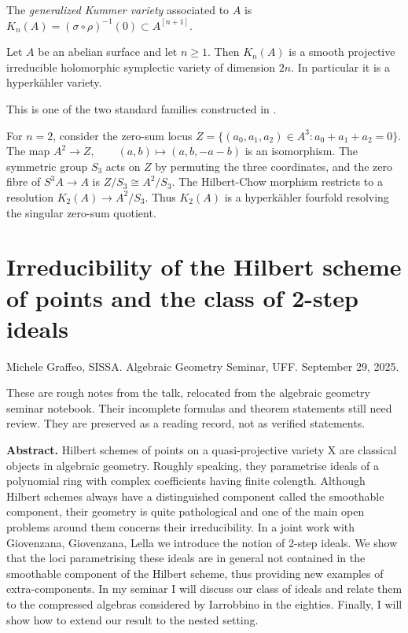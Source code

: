 \begin{definition}
\label{definition-generalized-kummer}
The {\it generalized Kummer variety}
associated to $A$ is
$
K_n(A)
=
(\sigma\circ\rho)^{-1}(0)
\subset A^{[n+1]}.
$
\end{definition}

\begin{theorem}[Beauville]
\label{theorem-generalized-kummer-hk}
Let $A$ be an abelian surface and let
$n\geq1$. Then $K_n(A)$ is a smooth
projective irreducible holomorphic symplectic
variety of dimension $2n$. In particular it
is a hyperk\"ahler variety.
\end{theorem}

\begin{reference}
This is one of the two standard families
constructed in \cite{beauville-kummer}.
\end{reference}

\begin{example}
\label{example-kummer-fourfold}
For $n=2$, consider the zero-sum locus
$
Z=
\{(a_0,a_1,a_2)\in A^3:
a_0+a_1+a_2=0\}.
$
The map
$
A^2\longrightarrow Z,
\qquad
(a,b)\longmapsto(a,b,-a-b)
$
is an isomorphism. The symmetric group
$S_3$ acts on $Z$ by permuting the three
coordinates, and the zero fibre of
$
S^3A\longrightarrow A
$
is
$
Z/S_3\cong A^2/S_3.
$
The Hilbert-Chow morphism restricts to a
resolution
$
K_2(A)\longrightarrow A^2/S_3.
$
Thus $K_2(A)$ is a hyperk\"ahler fourfold
resolving the singular zero-sum quotient.
\end{example}

\section{Irreducibility of the Hilbert scheme
of points and the class of 2-step
ideals}
\label{section-graffeo-two-step-ideals}

\noindent
Michele Graffeo, SISSA.
Algebraic Geometry Seminar, UFF.
September 29, 2025.

\medskip\noindent
These are rough notes from the talk,
relocated from the algebraic geometry
seminar notebook. Their incomplete formulas
and theorem statements still need review.
They are preserved as a reading record,
not as verified statements.

\medskip\noindent
{\bf Abstract.}
Hilbert schemes of points on a
quasi-projective variety X are classical
objects
in algebraic geometry. Roughly speaking, they
parametrise ideals of a polynomial
ring with complex coefficients having finite
colength. Although Hilbert schemes
always have a distinguished component called
the smoothable component, their
geometry is quite pathological and one of the
main open problems around them
concerns their irreducibility. In a joint
work with Giovenzana, Giovenzana,
Lella we introduce the notion of 2-step
ideals. We show that the loci
parametrising these ideals are in general not
contained in the smoothable
component of the Hilbert scheme, thus
providing new examples of
extra-components.  In my seminar I will
discuss our class of ideals and relate
them to the compressed algebras considered by
Iarrobbino in the eighties.
Finally, I will show how to extend our result
to the nested setting.


